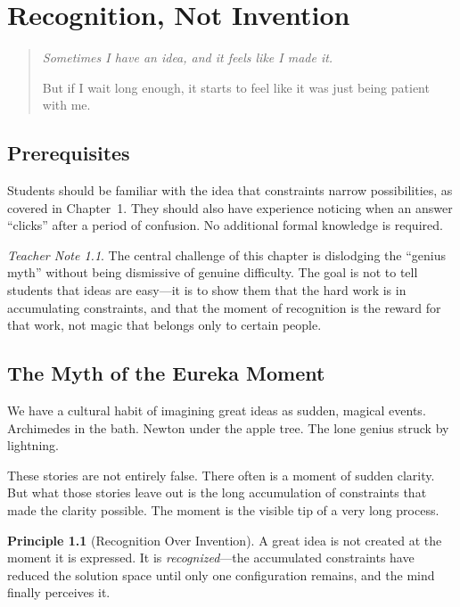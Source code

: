 \documentclass[11pt]{book}
\theoremstyle{definition}
\newtheorem{principle}[definition]{Principle}
\theoremstyle{remark}
\newtheorem{teachernote}{Teacher Note}[chapter]
\newenvironment{deepthought}
  {\begin{quote}\itshape}
  {\end{quote}}
\begin{document}
\chapter{Recognition, Not Invention}

\begin{deepthought}
Sometimes I have an idea, and it feels like I made it.

But if I wait long enough, it starts to feel like it was just being
patient with me.
\end{deepthought}

\section*{Prerequisites}

Students should be familiar with the idea that constraints narrow
possibilities, as covered in Chapter~1. They should also have experience
noticing when an answer ``clicks'' after a period of confusion. No
additional formal knowledge is required.

\begin{teachernote}
The central challenge of this chapter is dislodging the ``genius myth''
without being dismissive of genuine difficulty. The goal is not to tell
students that ideas are easy---it is to show them that the hard work
is in accumulating constraints, and that the moment of recognition is
the reward for that work, not magic that belongs only to certain people.
\end{teachernote}

\section{The Myth of the Eureka Moment}

We have a cultural habit of imagining great ideas as sudden, magical events.
Archimedes in the bath. Newton under the apple tree. The lone genius struck
by lightning.

These stories are not entirely false. There often is a moment of sudden
clarity. But what those stories leave out is the long accumulation of
constraints that made the clarity possible. The moment is the visible tip
of a very long process.

\begin{principle}[Recognition Over Invention]
A great idea is not created at the moment it is expressed. It is
\emph{recognized}---the accumulated constraints have reduced the solution
space until only one configuration remains, and the mind finally perceives it.
\end{principle}
\end{document}
